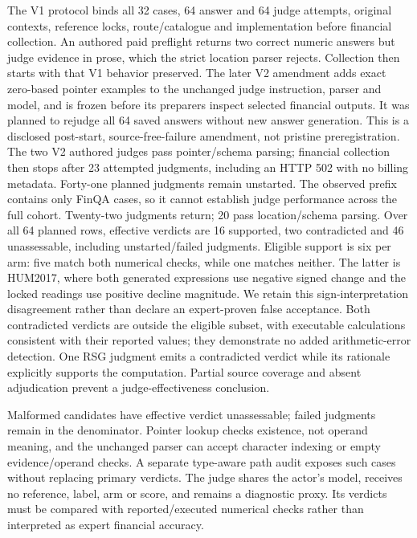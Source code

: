 The V1 protocol binds all 32 cases, 64 answer and 64 judge attempts, original contexts, reference locks, route/catalogue and implementation before financial collection. An authored paid preflight returns two correct numeric answers but judge evidence in prose, which the strict location parser rejects. Collection then starts with that V1 behavior preserved. The later V2 amendment adds exact zero-based pointer examples to the unchanged judge instruction, parser and model, and is frozen before its preparers inspect selected financial outputs. It was planned to rejudge all 64 saved answers without new answer generation. This is a disclosed post-start, source-free-failure amendment, not pristine preregistration. The two V2 authored judges pass pointer/schema parsing; financial collection then stops after 23 attempted judgments, including an HTTP 502 with no billing metadata. Forty-one planned judgments remain unstarted. The observed prefix contains only FinQA cases, so it cannot establish judge performance across the full cohort. Twenty-two judgments return; 20 pass location/schema parsing. Over all 64 planned rows, effective verdicts are 16 supported, two contradicted and 46 unassessable, including unstarted/failed judgments. Eligible support is six per arm: five match both numerical checks, while one matches neither. The latter is HUM2017, where both generated expressions use negative signed change and the locked readings use positive decline magnitude. We retain this sign-interpretation disagreement rather than declare an expert-proven false acceptance. Both contradicted verdicts are outside the eligible subset, with executable calculations consistent with their reported values; they demonstrate no added arithmetic-error detection. One RSG judgment emits a contradicted verdict while its rationale explicitly supports the computation. Partial source coverage and absent adjudication prevent a judge-effectiveness conclusion.

Malformed candidates have effective verdict unassessable; failed judgments remain in the denominator. Pointer lookup checks existence, not operand meaning, and the unchanged parser can accept character indexing or empty evidence/operand checks. A separate type-aware path audit exposes such cases without replacing primary verdicts. The judge shares the actor's model, receives no reference, label, arm or score, and remains a diagnostic proxy. Its verdicts must be compared with reported/executed numerical checks rather than interpreted as expert financial accuracy.

